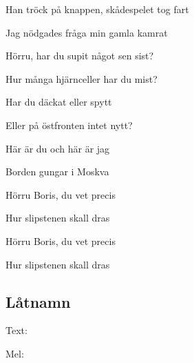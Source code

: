 Han tröck på knappen, skådespelet tog fart

Jag nödgades fråga min gamla kamrat\bigskip


Hörru, har du supit något sen sist?

Hur många hjärnceller har du mist?

Har du däckat eller spytt

Eller på östfronten intet nytt?

Här är du och här är jag

Borden gungar i Moskva

Hörru Boris, du vet precis

Hur slipstenen skall dras\bigskip


Hörru Boris, du vet precis

Hur slipstenen skall dras

\bigskip

\subsection{\textbf{Låtnamn}}

Text: 

Mel: \bigskip
\newpage
